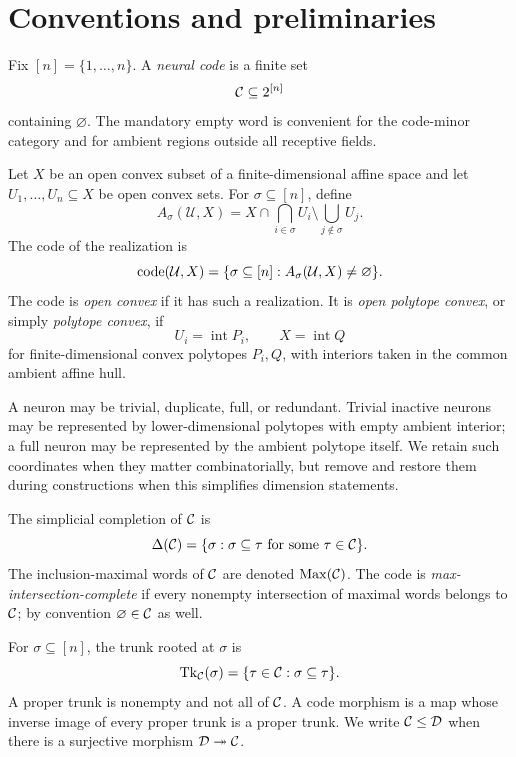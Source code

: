 \section{Conventions and preliminaries}
\label{sec:preliminaries}

Fix $[n]=\{1,\ldots,n\}$.  A \emph{neural code} is a finite set
\[
 \mathcal C\subseteq 2^{[n]}
\]
containing $\varnothing$.  The mandatory empty word is convenient for the code-minor category and for ambient regions outside all receptive fields.

\begin{definition}
Let $X$ be an open convex subset of a finite-dimensional affine space and let $U_1,\ldots,U_n\subseteq X$ be open convex sets.  For $\sigma\subseteq[n]$, define
\[
 A_\sigma(\mathcal U,X)
 =X\cap\bigcap_{i\in\sigma}U_i\setminus\bigcup_{j\notin\sigma}U_j.
\]
The code of the realization is
\[
 \operatorname{code}(\mathcal U,X)=\{\sigma\subseteq[n]:A_\sigma(\mathcal U,X)\ne\varnothing\}.
\]
The code is \emph{open convex} if it has such a realization.  It is \emph{open polytope convex}, or simply \emph{polytope convex}, if
\[
 U_i=\operatorname{int}P_i,
 \qquad X=\operatorname{int}Q
\]
for finite-dimensional convex polytopes $P_i,Q$, with interiors taken in the common ambient affine hull.
\end{definition}

A neuron may be trivial, duplicate, full, or redundant.  Trivial inactive neurons may be represented by lower-dimensional polytopes with empty ambient interior; a full neuron may be represented by the ambient polytope itself.  We retain such coordinates when they matter combinatorially, but remove and restore them during constructions when this simplifies dimension statements.

\begin{definition}
The simplicial completion of $\mathcal C$ is
\[
 \Delta(\mathcal C)=\{\sigma:\sigma\subseteq\tau\text{ for some }\tau\in\mathcal C\}.
\]
The inclusion-maximal words of $\mathcal C$ are denoted $\operatorname{Max}(\mathcal C)$.  The code is \emph{max-intersection-complete} if every nonempty intersection of maximal words belongs to $\mathcal C$; by convention $\varnothing\in\mathcal C$ as well.
\end{definition}

\begin{definition}
For $\sigma\subseteq[n]$, the trunk rooted at $\sigma$ is
\[
 \operatorname{Tk}_\mathcal C(\sigma)=\{\tau\in\mathcal C:\sigma\subseteq\tau\}.
\]
A proper trunk is nonempty and not all of $\mathcal C$.  A code morphism is a map whose inverse image of every proper trunk is a proper trunk.  We write $\mathcal C\le\mathcal D$ when there is a surjective morphism $\mathcal D\twoheadrightarrow\mathcal C$.
\end{definition}

